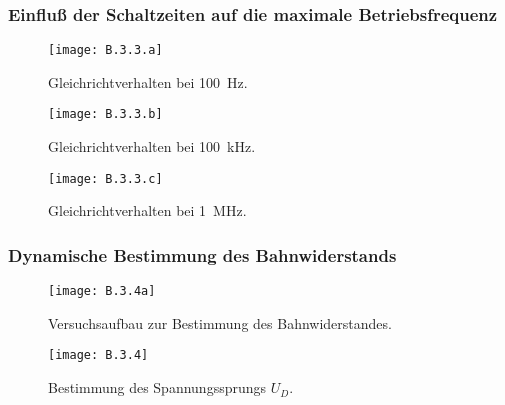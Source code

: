 \documentclass[
	a4paper, %
	12pt, %
]{CSUniSchoolLabReport}
\begin{document}
\subsubsection{Einfluß der Schaltzeiten auf die maximale Betriebsfrequenz}
\begin{figure}[H] %
	\centering %
	\texttt{[image: B.3.3.a]} %
	\caption{Gleichrichtverhalten bei \SI{100}{\hertz}.}
\end{figure}
\begin{figure}[H] %
	\centering %
	\texttt{[image: B.3.3.b]} %
	\caption{Gleichrichtverhalten bei \SI{100}{\kilo\hertz}.}
\end{figure}
\begin{figure}[H] %
	\centering %
	\texttt{[image: B.3.3.c]} %
	\caption{Gleichrichtverhalten bei \SI{1}{\mega\hertz}.}
\end{figure}

\vspace{5em}

\subsubsection{Dynamische Bestimmung des Bahnwiderstands}

\begin{figure}[H] %
	\centering %
	\texttt{[image: B.3.4a]} %
	\caption{Versuchsaufbau zur Bestimmung des Bahnwiderstandes.}
\end{figure}

\begin{figure}[H] %
	\centering %
	\texttt{[image: B.3.4]} %
	\caption{Bestimmung des Spannungssprungs $U_D$.}
\end{figure}

\vspace{1em}
\end{document}
